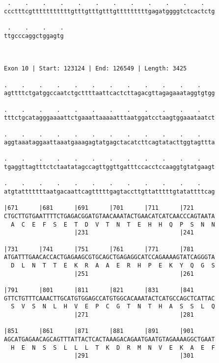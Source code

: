 \documentclass{article}
\begin{document}
\begin{Verbatim}
 .    .    .    .    .    .    .    .    .    .    .    .   
ccctttcgtttttttttttgtttgtttgtttgtttttttttgagatggggtctcactctg
                                                            
 .    .    .    .
ttgcccaggctggagtg
                 
                 
 
Exon 10 | Start: 123124 | End: 126549 | Length: 3425
 
.    .    .    .    .    .    .    .    .    .    .    .    
agttttctgatggccaatctgcttttaattcactcttagacgttagagaaataggtgtgg
                                                            
.    .    .    .    .    .    .    .    .    .    .    .    
tttctgcatagggaaaattctgaaattaaaaatttaatggatcctaagtggaaataatct
                                                            
.    .    .    .    .    .    .    .    .    .    .    .    
aggtaaataggaattaaatgaaagagtatgagctacatcttcagtatacttggtagttta
                                                            
.    .    .    .    .    .    .    .    .    .    .    .    
tgaggttagtttctctaatatagccagttggttgatttccacctccaaggtgtatgaagt
                                                            
.    .    .    .    .    .    .    .    .    .    .    .    
atgtatttttttaatgacaattcagtttttgagtaccttgttatttttgtatattttcag
                                                            
|671      |681      |691      |701      |711      |721      
CTGCTTGTGAATTTTCTGAGACGGATGTAACAAATACTGAACATCATCAACCCAGTAATA
  A  C  E  F  S  E  T  D  V  T  N  T  E  H  H  Q  P  S  N  N
                    |231                          |241      
  
|731      |741      |751      |761      |771      |781      
ATGATTTGAACACCACTGAGAAGCGTGCAGCTGAGAGGCATCCAGAAAAGTATCAGGGTA
  D  L  N  T  T  E  K  R  A  A  E  R  H  P  E  K  Y  Q  G  S
                    |251                          |261      
  
|791      |801      |811      |821      |831      |841      
GTTCTGTTTCAAACTTGCATGTGGAGCCATGTGGCACAAATACTCATGCCAGCTCATTAC
  S  V  S  N  L  H  V  E  P  C  G  T  N  T  H  A  S  S  L  Q
                    |271                          |281      
  
|851      |861      |871      |881      |891      |901      
AGCATGAGAACAGCAGTTTATTACTCACTAAAGACAGAATGAATGTAGAAAAGGCTGAAT
  H  E  N  S  S  L  L  L  T  K  D  R  M  N  V  E  K  A  E  F
                    |291                          |301      
  

\end{Verbatim}
\end{document}
